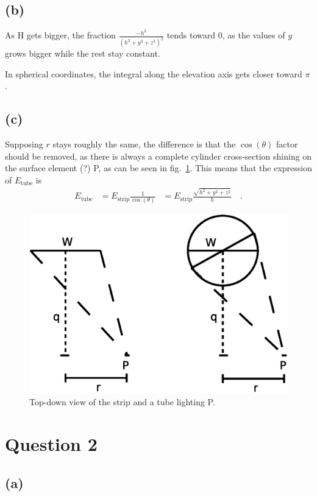 \documentclass{report}
\begin{document}
\subsection{(b)}

As H gets bigger, the fraction $\frac{-h^2}{\left(h^2 + y^2 + z^2\right)^2}$ tends toward $0$, as the values of $y$ grows bigger while the rest stay constant.

In spherical coordinates, the integral along the elevation axis gets closer toward $\pi$.

\subsection{(c)}

Supposing $r$ stays roughly the same, the difference is that the $\cos(\theta)$ factor should be removed, as there is always a complete cylinder cross-section shining on the surface element (?) P, as can be seen in fig.~\ref{q1c:setup}. This means that the expression of $E_{\text{tube}}$ is
\begin{align}
E_{\text{tube}} &= E_{\text{strip}} \frac{1}{\cos(\theta)}
                &= E_{\text{strip}} \frac{\sqrt{h^2+y^2+z^2}}{h}
\quad.
\end{align}

\begin{figure}
  \centering
  \includegraphics[width=0.45\linewidth]{q1c_setup.eps}
  \caption[Problem setup]
   {Top-down view of the strip and a tube lighting P.}
  \label{q1c:setup}
\end{figure}

\section{Question 2}
\subsection{(a)}
\end{document}
